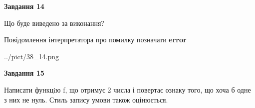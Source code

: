 \documentclass[11pt, ukrainian]{article}
\begin{document}
{\begin {large}
{\begin {center}\textbf{Завдання 14}\end {center}}\par
Що буде виведено за виконання? \par
Повідомлення інтерпретатора про помилку позначати \textbf{error}

\begin{center}
	{../pict/38_14.png}
\end{center}
\newpage

{\begin {center}\textbf{Завдання 15}\end {center}}\par

Написати функцiю f, що отримує 2 числа і повертає ознаку того, що хоча б одне з них не нуль. Стиль запису умови також оцінюється.\par
\newpage

\end {large}}
\end{document}
